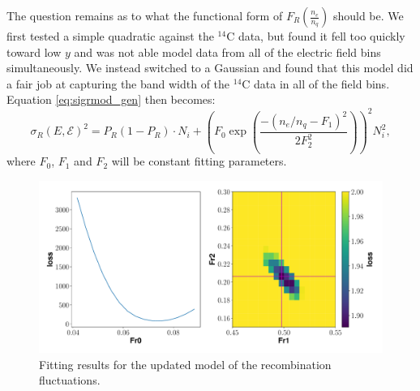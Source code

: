 The question remains as to what the functional form of $F_{R}(\frac{n_e}{n_q})$ should be. We first tested a simple quadratic against the $^{14}$C data, but found it fell too quickly toward low $y$ and was not able model data from all of the electric field bins simultaneously. We instead switched to a Gaussian and found that this model did a fair job at capturing the band width of the $^{14}$C data in all of the field bins. Equation \ref{eq:sigrmod_gen} then becomes:
\begin{equation}\label{eq:sigrmod}
\sigma_{R}(E,\mathcal{E})^2=P_{R}(1-P_{R})\cdot N_i +\left(F_0\exp \left(\frac{-(n_e/n_q-F_1)^2}{2F_2^2}\right)\right)^2N_i^2,
\end{equation}
where $F_0$, $F_1$ and $F_2$ will be constant fitting parameters.
\begin{figure}[h!]
\centering
  \includegraphics[width=\textwidth]{Figures/sigR_fit_gfdcm.pdf}
\caption{Fitting results for the updated model of the recombination fluctuations.}
\label{fig:sigrfit}
\end{figure}

